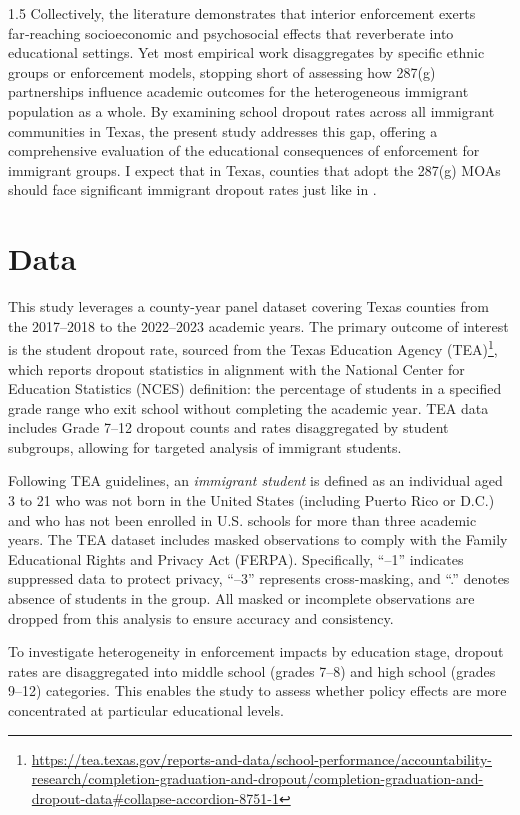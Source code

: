 \documentclass[12pt]{article}
\begin{document}
\begin{spacing}{1.5}
Collectively, the literature demonstrates that interior enforcement exerts far‑reaching socioeconomic and psychosocial effects that reverberate into educational settings. Yet most empirical work disaggregates by specific ethnic groups or enforcement models, stopping short of assessing how 287(g) partnerships influence academic outcomes for the heterogeneous immigrant population as a whole. By examining school dropout rates across all immigrant communities in Texas, the present study addresses this gap, offering a comprehensive evaluation of the educational consequences of enforcement for immigrant groups. I expect that in Texas, counties that adopt the 287(g) MOAs should face significant immigrant dropout rates just like in \citet{amuedo2015}.

\section{Data}
This study leverages a county-year panel dataset covering Texas counties from the 2017–2018 to the 2022–2023 academic years. The primary outcome of interest is the student dropout rate, sourced from the {Texas Education Agency (TEA)}\footnote{\url{https://tea.texas.gov/reports-and-data/school-performance/accountability-research/completion-graduation-and-dropout/completion-graduation-and-dropout-data#collapse-accordion-8751-1}}, which reports dropout statistics in alignment with the National Center for Education Statistics (NCES) definition: the percentage of students in a specified grade range who exit school without completing the academic year. TEA data includes Grade 7–12 dropout counts and rates disaggregated by student subgroups, allowing for targeted analysis of immigrant students.

Following TEA guidelines, an \textit{immigrant student} is defined as an individual aged 3 to 21 who was not born in the United States (including Puerto Rico or D.C.) and who has not been enrolled in U.S. schools for more than three academic years. The TEA dataset includes masked observations to comply with the Family Educational Rights and Privacy Act (FERPA). Specifically, “–1” indicates suppressed data to protect privacy, “–3” represents cross-masking, and “.” denotes absence of students in the group. All masked or incomplete observations are dropped from this analysis to ensure accuracy and consistency.

To investigate heterogeneity in enforcement impacts by education stage, dropout rates are disaggregated into middle school (grades 7–8) and high school (grades 9–12) categories. This enables the study to assess whether policy effects are more concentrated at particular educational levels.


\end{spacing}
\end{document}
